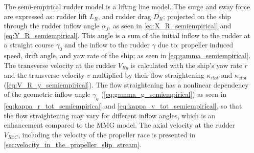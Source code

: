The semi-empirical rudder model is a lifting line model. The surge and sway force are expressed as: rudder lift $L_R$, and rudder drag $D_R$; projected on the ship through the rudder inflow angle $\alpha_f$, as seen in \autoref{eq:X_R_semiempirical} and \autoref{eq:Y_R_semiempirical}.
This angle is a sum of the initial inflow to the rudder at a straight course $\gamma_0$ and the inflow to the rudder $\gamma$ due to: propeller induced speed, drift angle, and yaw rate of the ship; as seen in \autoref{eq:gamma_semiempirical}.
\begin{equation}
    \label{eq:X_R_semiempirical}
    
\end{equation}
%
\begin{equation}
    \label{eq:Y_R_semiempirical}
    
\end{equation}
%
\begin{equation}
    \label{eq:alpha_f_semiempirical}
    
\end{equation}
%
\begin{equation}
    \label{eq:gamma_semiempirical}
    
\end{equation}
The transverse velocity at the rudder $V_{Ry}$ is calculated with the ship's yaw rate $r$ and the transverse velocity $v$ multiplied by their flow straightening $\kappa_{rtot}$ and $\kappa_{vtot}$ (\autoref{eq:V_R_y_semiempirical}). The flow straightening has a nonlinear dependency of the geometric inflow angle $\gamma_g$ (\autoref{eq:gamma_g_semiempirical}) as seen in \autoref{eq:kappa_r_tot_semiempirical} and \autoref{eq:kappa_v_tot_semiempirical}, so that the flow straightening may vary for different inflow angles, which is an enhancement compared to the MMG model.
The axial velocity at the rudder $V_{RxC}$, including the velocity of the propeller race is presented in \autoref{sec:velocity_in_the_propeller_slip_stream}.
\begin{equation}
    \label{eq:V_R_y_semiempirical}
    
\end{equation}
%
\begin{equation}
    \label{eq:kappa_r_tot_semiempirical}
    
\end{equation}
%
\begin{equation}
    \label{eq:kappa_v_tot_semiempirical}
    
\end{equation}
%
\begin{equation}
    \label{eq:gamma_g_semiempirical}
    
\end{equation}

